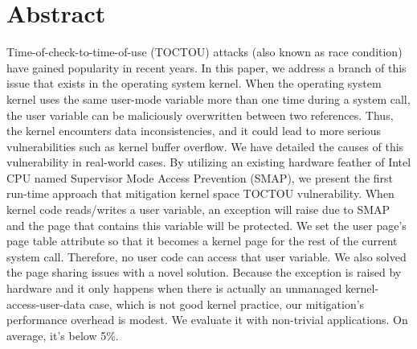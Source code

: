 \section{Abstract}


Time-of-check-to-time-of-use (TOCTOU) attacks (also known as race condition) have gained popularity in recent years. In this paper, we address a branch of this issue that exists in the operating system kernel. When the operating system kernel uses the same user-mode variable more than one time during a system call, the user variable can be maliciously overwritten between two references. Thus, the kernel encounters data inconsistencies, and it could lead to more serious vulnerabilities such as kernel buffer overflow. We have detailed the causes of this vulnerability in real-world cases. By utilizing an existing hardware feather of Intel CPU named Supervisor Mode Access Prevention (SMAP), we present the first run-time approach that mitigation kernel space TOCTOU vulnerability. When kernel code reads/writes a user variable, an exception will raise due to SMAP and the page that contains this variable will be protected. We set the user page's page table attribute so that it becomes a kernel page for the rest of the current system call. Therefore, no user code can access that user variable. We also solved the page sharing issues with a novel solution. Because the exception is raised by hardware and it only happens when there is actually an unmanaged kernel-access-user-data case, which is not good kernel practice, our mitigation's performance overhead is modest. We evaluate it with non-trivial applications. On average, it's below 5\%.
